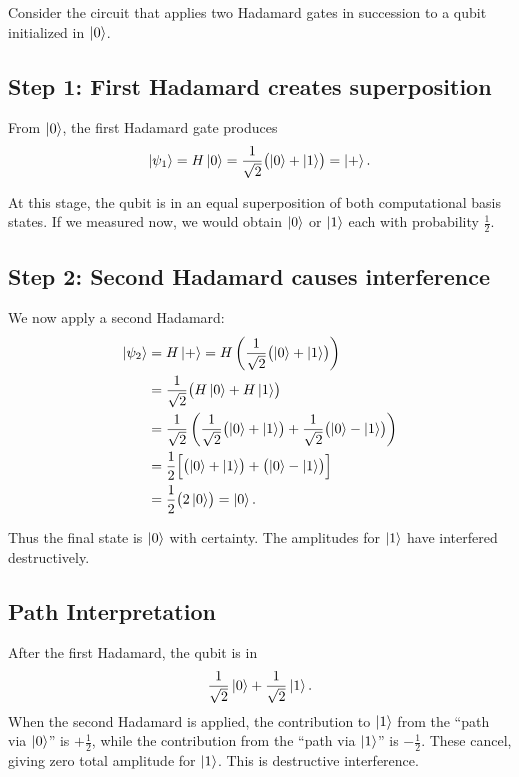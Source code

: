 \documentclass[a4paper,11pt]{article}
\providecommand{\ket}[1]{\mathinner{|{#1}\rangle}}
\begin{document}
Consider the circuit that applies two Hadamard gates in succession to a qubit initialized in
$\ket{0}$.

\subsection*{Step 1: First Hadamard creates superposition}

From $\ket{0}$, the first Hadamard gate produces
\begin{equation}
  \ket{\psi_1} = H\ket{0} = \frac{1}{\sqrt{2}}\bigl(\ket{0} + \ket{1}\bigr) = \ket{+}.
\end{equation}

At this stage, the qubit is in an equal superposition of both computational basis states. If we
measured now, we would obtain $\ket{0}$ or $\ket{1}$ each with probability $\frac{1}{2}$.

\subsection*{Step 2: Second Hadamard causes interference}

We now apply a second Hadamard:
\begin{align}
  \ket{\psi_2} &= H\ket{+} = H\left(\frac{1}{\sqrt{2}}\bigl(\ket{0} + \ket{1}\bigr)\right) \\
  &= \frac{1}{\sqrt{2}}\bigl(H\ket{0} + H\ket{1}\bigr) \\
  &= \frac{1}{\sqrt{2}}\left(\frac{1}{\sqrt{2}}\bigl(\ket{0} + \ket{1}\bigr)
     + \frac{1}{\sqrt{2}}\bigl(\ket{0} - \ket{1}\bigr)\right) \\
  &= \frac{1}{2}\Bigl[\bigl(\ket{0} + \ket{1}\bigr) + \bigl(\ket{0} - \ket{1}\bigr)\Bigr] \\
  &= \frac{1}{2}\bigl(2\ket{0}\bigr) = \ket{0}.
\end{align}

Thus the final state is $\ket{0}$ with certainty. The amplitudes for $\ket{1}$ have interfered
destructively.

\subsection*{Path Interpretation}

After the first Hadamard, the qubit is in
\[
  \frac{1}{\sqrt{2}}\ket{0} + \frac{1}{\sqrt{2}}\ket{1}.
\]
When the second Hadamard is applied, the contribution to $\ket{1}$ from the ``path via $\ket{0}$''
is $+\frac{1}{2}$, while the contribution from the ``path via $\ket{1}$'' is $-\frac{1}{2}$. These
cancel, giving zero total amplitude for $\ket{1}$. This is destructive interference.
\end{document}
